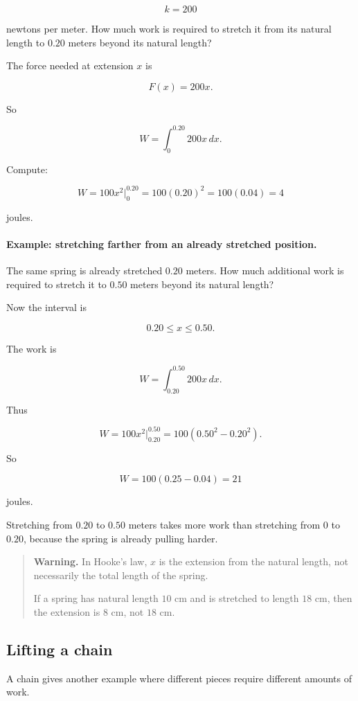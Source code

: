 \[
k=200
\]

newtons per meter.  How much work is required to stretch it from its natural length
to \(0.20\) meters beyond its natural length?

The force needed at extension \(x\) is

\[
F(x)=200x.
\]

So

\[
W=\int_0^{0.20} 200x\,dx.
\]

Compute:

\[
W=
100x^2\Big|_0^{0.20}
=
100(0.20)^2
=
100(0.04)
=
\boxed{4}
\]

joules.

\paragraph{Example: stretching farther from an already stretched position.}
The same spring is already stretched \(0.20\) meters.  How much additional work is
required to stretch it to \(0.50\) meters beyond its natural length?

Now the interval is

\[
0.20\le x\le0.50.
\]

The work is

\[
W=\int_{0.20}^{0.50} 200x\,dx.
\]

Thus

\[
W=100x^2\Big|_{0.20}^{0.50}
=
100\left(0.50^2-0.20^2\right).
\]

So

\[
W=100(0.25-0.04)=\boxed{21}
\]

joules.

Stretching from \(0.20\) to \(0.50\) meters takes more work than stretching from
\(0\) to \(0.20\), because the spring is already pulling harder.

\begin{quote}
\textbf{Warning.}
In Hooke's law, \(x\) is the extension from the natural length, not necessarily the
total length of the spring.

If a spring has natural length \(10\) cm and is stretched to length \(18\) cm, then the
extension is \(8\) cm, not \(18\) cm.
\end{quote}

\subsection{Lifting a chain}
\label{subsec:lifting-chain}

A chain gives another example where different pieces require different amounts of work.


